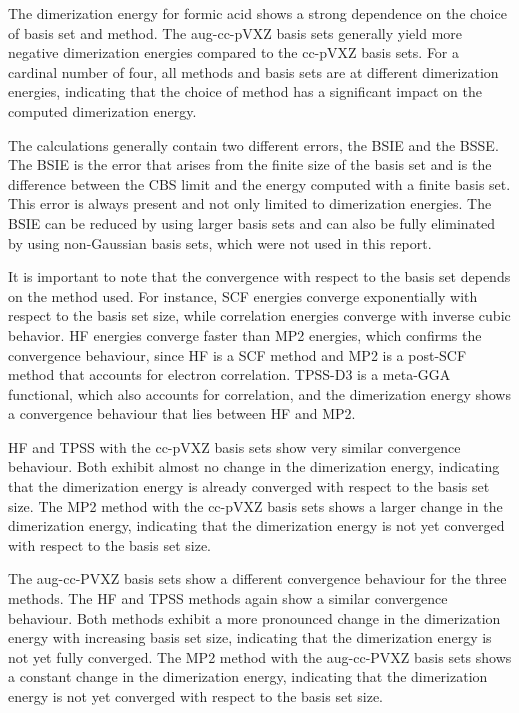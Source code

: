 \documentclass[fontsize=11pt,a4paper,oneside]{scrartcl}
\begin{document}
The dimerization energy for formic acid shows a strong dependence on the choice of basis set and method. The aug-cc-pVXZ basis sets generally yield more negative dimerization energies compared to the cc-pVXZ basis sets. For a cardinal number of four, all methods and basis sets are at different dimerization energies, indicating that the choice of method has a significant impact on the computed dimerization energy.

The calculations generally contain two different errors, the \ac{BSIE} and the \ac{BSSE}. The \ac{BSIE} is the error that arises from the finite size of the basis set and is the difference between the \ac{CBS} limit and the energy computed with a finite basis set. This error is always present and not only limited to dimerization energies. The \ac{BSIE} can be reduced by using larger basis sets and can also be fully eliminated by using non-Gaussian basis sets, which were not used in this report.

It is important to note that the convergence with respect to the basis set depends on the method used. For instance, SCF energies converge exponentially with respect to the basis set size, while correlation energies converge with inverse cubic behavior. \Ac{HF} energies converge faster than \ac{MP2} energies, which confirms the convergence behaviour, since \ac{HF} is a SCF method and \ac{MP2} is a post-SCF method that accounts for electron correlation. \Ac{TPSS}-D3 is a  meta-GGA functional, which also accounts for correlation, and the dimerization energy shows a convergence behaviour that lies between \ac{HF} and \ac{MP2}.

\Ac{HF} and \ac{TPSS} with the cc-pVXZ basis sets show very similar convergence behaviour. Both exhibit almost no change in the dimerization energy, indicating that the dimerization energy is already converged with respect to the basis set size. The \ac{MP2} method with the cc-pVXZ basis sets shows a larger change in the dimerization energy, indicating that the dimerization energy is not yet converged with respect to the basis set size.

The aug-cc-PVXZ basis sets show a different convergence behaviour for the three methods. The \ac{HF} and \ac{TPSS} methods again show a similar convergence behaviour. Both methods exhibit a more pronounced change in the dimerization energy with increasing basis set size, indicating that the dimerization energy is not yet fully converged. The \ac{MP2} method with the aug-cc-PVXZ basis sets shows a constant change in the dimerization energy, indicating that the dimerization energy is not yet converged with respect to the basis set size.
\end{document}
